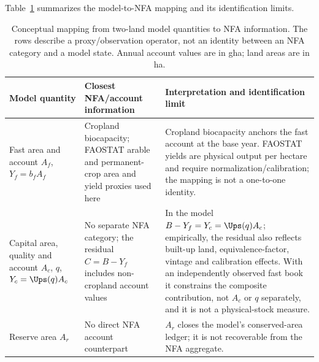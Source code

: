 Table~\ref{tab:si_model_nfa} summarizes the model-to-NFA mapping and its identification limits.

\begin{table}[htbp]
\centering\small
\caption{Conceptual mapping from two-land model quantities to NFA information. The rows describe a proxy/observation operator, not an identity between an NFA category and a model state. Annual account values are in gha; land areas are in ha.}
\label{tab:si_model_nfa}
\begin{tabularx}{\textwidth}{>{\raggedright\arraybackslash}p{} >{\raggedright\arraybackslash}p{} X}
\toprule
Model quantity & Closest NFA/account information & Interpretation and identification limit \\
\midrule
Fast area and account $A_f$, $Y_f=b_fA_f$ & Cropland biocapacity; FAOSTAT arable and permanent-crop area and yield proxies used here & Cropland biocapacity anchors the fast account at the base year. FAOSTAT yields are physical output per hectare and require normalization/calibration; the mapping is not a one-to-one identity. \\
Capital area, quality and account $A_c$, $q$, $Y_c=\Ups(q)A_c$ & No separate NFA category; the residual $C=B-Y_f$ includes non-cropland account values & In the model $B-Y_f=Y_c=\Ups(q)A_c$; empirically, the residual also reflects built-up land, equivalence-factor, vintage and calibration effects. With an independently observed fast book it constrains the composite contribution, not $A_c$ or $q$ separately, and it is not a physical-stock measure. \\
Reserve area $A_r$ & No direct NFA account counterpart & $A_r$ closes the model's conserved-area ledger; it is not recoverable from the NFA aggregate. \\
\bottomrule
\end{tabularx}
\end{table}

